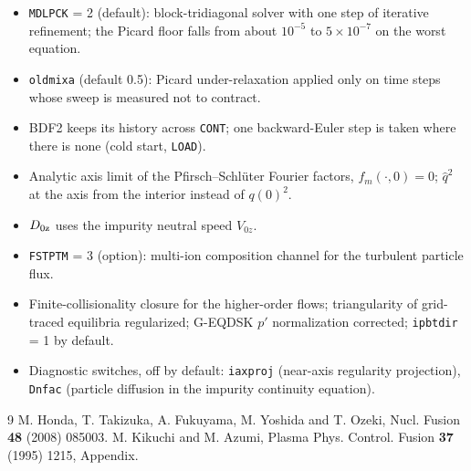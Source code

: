 \documentclass[11pt]{article}
\def\r#1{{\rm#1}}
\begin{document}
\begin{itemize}
\item \texttt{MDLPCK} = 2 (default): block-tridiagonal solver with one step of
  iterative refinement; the Picard floor falls from about $10^{-5}$ to
  $5\times10^{-7}$ on the worst equation.
\item \texttt{oldmixa} (default 0.5): Picard under-relaxation applied only on
  time steps whose sweep is measured not to contract.
\item BDF2 keeps its history across \texttt{CONT}; one backward-Euler step is
  taken where there is none (cold start, \texttt{LOAD}).
\item Analytic axis limit of the Pfirsch--Schl\"uter Fourier factors,
  $f_m(\cdot,0) = 0$; $\hat q^2$ at the axis from the interior instead of $q(0)^2$.
\item $D_{0\r{z}}$ uses the impurity neutral speed $V_{0z}$.
\item \texttt{FSTPTM} = 3 (option): multi-ion composition channel for the
  turbulent particle flux.
\item Finite-collisionality closure for the higher-order flows; triangularity of
  grid-traced equilibria regularized; G-EQDSK $p'$ normalization corrected;
  \texttt{ipbtdir} = 1 by default.
\item Diagnostic switches, off by default: \texttt{iaxproj} (near-axis
  regularity projection), \texttt{Dnfac} (particle diffusion in the impurity
  continuity equation).
\end{itemize}

\begin{thebibliography}{9}
 M. Honda, T. Takizuka, A. Fukuyama, M. Yoshida and T. Ozeki,
  Nucl. Fusion \textbf{48} (2008) 085003.
 M. Kikuchi and M. Azumi, Plasma Phys. Control. Fusion \textbf{37} (1995) 1215,
  Appendix.
\end{thebibliography}
\end{document}
